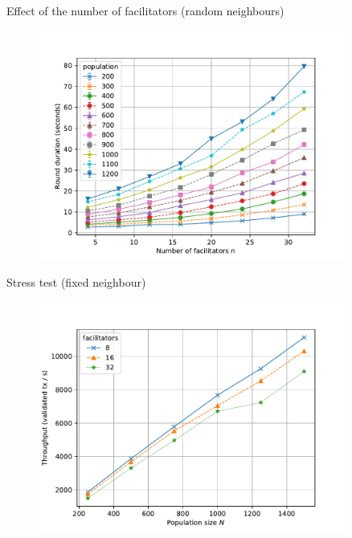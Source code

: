 \documentclass{beamer}
\begin{document}
\begin{frame}[noframenumbering]{Effect of the number of facilitators (random neighbours)}
  \begin{figure}
    \includegraphics[width=0.9\textwidth]{neighbour-random/round-duration-vs-facilitators}
    \centering
  \end{figure}
\end{frame}

\begin{frame}[noframenumbering]{Stress test (fixed neighbour)}
  \begin{figure}[h]
  \includegraphics[width=0.9\textwidth]{throughput-vs-population-large}
  \centering
  \end{figure}
\end{frame}
\end{document}
